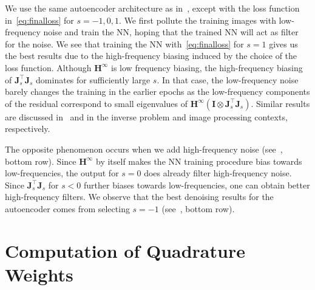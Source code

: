 We use the same autoencoder architecture as in~\citep{autoencoder}, except with the loss function in~\cref{eq:finalloss} for $s = -1, 0, 1$.  We first pollute the training images with low-frequency noise and train the NN, hoping that the trained NN will act as filter for the noise. We see that training the NN with~\cref{eq:finalloss} for $s = 1$ gives us the best results due to the high-frequency biasing induced by the choice of the loss function. Although $\mathbf{H}^\infty$ is low frequency biasing, the high-frequency biasing of $\mathbf{J}_s^\top \mathbf{J}_s$ dominates for sufficiently large $s$. In that case, the low-frequency noise barely changes the training in the earlier epochs as the low-frequency components of the residual correspond to small eigenvalues of $\mathbf{H}^\infty (\mathbf{I} \otimes \mathbf{J}_s^\top \mathbf{J}_s)$.  Similar results are discussed in~\citep{engquist2020quadratic} and \citep{yang2021implicit} in the inverse problem and image processing contexts, respectively.

The opposite phenomenon occurs when we add high-frequency noise (see~, bottom row). Since $\mathbf{H}^\infty$ by itself makes the NN training procedure bias towards low-frequencies, the output for $s=0$ does already filter high-frequency noise. Since $\mathbf{J}_s^\top \mathbf{J}_s$ for $s<0$ further biases towards low-frequencies, one can obtain better high-frequency filters. We observe that the best denoising results for the autoencoder comes from selecting $s=-1$ (see~, bottom row).

\section{Computation of Quadrature Weights}\label{sec:computeweight}


